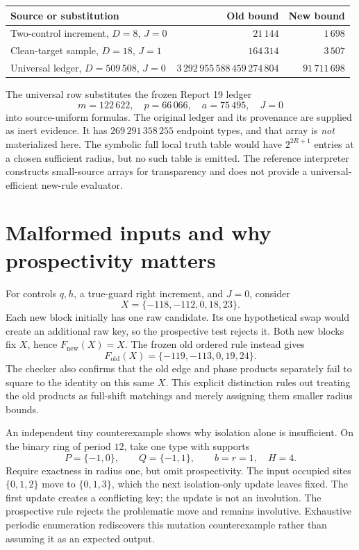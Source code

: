 \documentclass[11pt,a4paper]{article}
\numberwithin{equation}{section}
\newcommand{\Fnew}{F_{\mathrm{new}}}\newcommand{\Fold}{F_{\mathrm{old}}}
\begin{document}
\begin{center}
\begin{tabular}{lrr}\toprule
Source or substitution & Old bound & New bound\\\midrule
Two-control increment, $D=8$, $J=0$ & $21\,144$ & $1\,698$\\
Clean-target sample, $D=18$, $J=1$ & $164\,314$ & $3\,507$\\
Universal ledger, $D=509\,508$, $J=0$
 & $3\,292\,955\,588\,459\,274\,804$ & $91\,711\,698$\\\bottomrule
\end{tabular}
\end{center}
The universal row substitutes the frozen Report 19 ledger
\[
 m=122\,622,\quad p=66\,066,\quad a=75\,495,\quad J=0
\]
into source-uniform formulas. The original ledger and its provenance are supplied as inert evidence. It has $269\,291\,358\,255$ endpoint types, and that array is \emph{not} materialized here. The symbolic full local truth table would have $2^{2R+1}$ entries at a chosen sufficient radius, but no such table is emitted. The reference interpreter constructs small-source arrays for transparency and does not provide a universal-efficient new-rule evaluator.

\section{Malformed inputs and why prospectivity matters}\label{fpa:pi:sec:counterexamples}
For controls $q,h$, a true-guard right increment, and $J=0$, consider
\[
 X=\{-118,-112,0,18,23\}.
\]
Each new block initially has one raw candidate. Its one hypothetical swap would create an additional raw key, so the prospective test rejects it. Both new blocks fix $X$, hence $\Fnew(X)=X$. The frozen old ordered rule instead gives
\[
 \Fold(X)=\{-119,-113,0,19,24\}.
\]
The checker also confirms that the old edge and phase products separately fail to square to the identity on this same $X$. This explicit distinction rules out treating the old products as full-shift matchings and merely assigning them smaller radius bounds.

An independent tiny counterexample shows why isolation alone is insufficient. On the binary ring of period $12$, take one type with supports
\[
 P=\{-1,0\},\qquad Q=\{-1,1\},\qquad b=r=1,\quad H=4.
\]
Require exactness in radius one, but omit prospectivity. The input occupied sites $\{0,1,2\}$ move to $\{0,1,3\}$, which the next isolation-only update leaves fixed. The first update creates a conflicting key; the update is not an involution. The prospective rule rejects the problematic move and remains involutive. Exhaustive periodic enumeration rediscovers this mutation counterexample rather than assuming it as an expected output.
\end{document}
